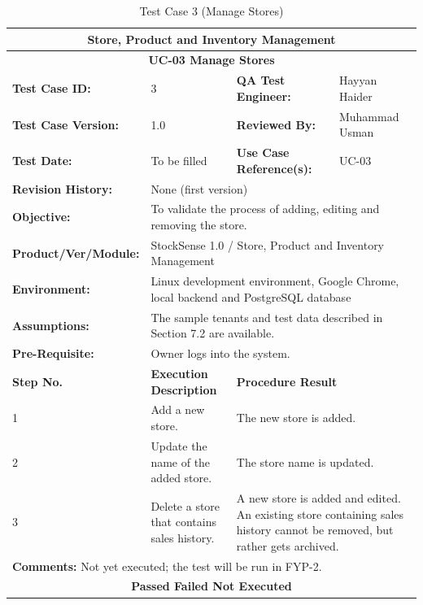 \documentclass{StockSense}
\begin{document}
\begin{table}[!htbp]
\centering
\caption{Test Case 3 (Manage Stores)}
{\small\linespread{1}\selectfont\renewcommand{\arraystretch}{1.25}
\begin{tabular}{|p{}|p{}|p{}|p{}|}
\hline
\multicolumn{4}{|c|}{\textbf{Store, Product and Inventory Management}} \\ \hline
\multicolumn{4}{|c|}{\textbf{UC-03 Manage Stores}} \\ \hline
\textbf{Test Case ID:} & 3 & \textbf{QA Test Engineer:} & Hayyan Haider \\ \hline
\textbf{Test Case Version:} & 1.0 & \textbf{Reviewed By:} & Muhammad Usman \\ \hline
\textbf{Test Date:} & To be filled & \textbf{Use Case Reference(s):} & UC-03 \\ \hline
\textbf{Revision History:} & \multicolumn{3}{p{\dimexpr0.70\textwidth+4\tabcolsep\relax}|}{None (first version)} \\ \hline
\textbf{Objective:} & \multicolumn{3}{p{\dimexpr0.70\textwidth+4\tabcolsep\relax}|}{To validate the process of adding, editing and removing the store.} \\ \hline
\textbf{Product/Ver/Module:} & \multicolumn{3}{p{\dimexpr0.70\textwidth+4\tabcolsep\relax}|}{StockSense 1.0 / Store, Product and Inventory Management} \\ \hline
\textbf{Environment:} & \multicolumn{3}{p{\dimexpr0.70\textwidth+4\tabcolsep\relax}|}{Linux development environment, Google Chrome, local backend and PostgreSQL database} \\ \hline
\textbf{Assumptions:} & \multicolumn{3}{p{\dimexpr0.70\textwidth+4\tabcolsep\relax}|}{The sample tenants and test data described in Section 7.2 are available.} \\ \hline
\textbf{Pre-Requisite:} & \multicolumn{3}{p{\dimexpr0.70\textwidth+4\tabcolsep\relax}|}{Owner logs into the system.} \\ \hline
\textbf{Step No.} & \textbf{Execution Description} & \multicolumn{2}{l|}{\textbf{Procedure Result}} \\ \hline
1 & Add a new store. & \multicolumn{2}{p{\dimexpr0.42\textwidth+2\tabcolsep\relax}|}{The new store is added.} \\ \hline
2 & Update the name of the added store. & \multicolumn{2}{p{\dimexpr0.42\textwidth+2\tabcolsep\relax}|}{The store name is updated.} \\ \hline
3 & Delete a store that contains sales history. & \multicolumn{2}{p{\dimexpr0.42\textwidth+2\tabcolsep\relax}|}{A new store is added and edited. An existing store containing sales history cannot be removed, but rather gets archived.} \\ \hline
\multicolumn{4}{|l|}{\textbf{Comments:} Not yet executed; the test will be run in FYP-2.} \\ \hline
\multicolumn{4}{|c|}{\textbf{Passed \quad Failed \quad Not Executed}} \\ \hline
\end{tabular}\par}
\end{table}
\end{document}

